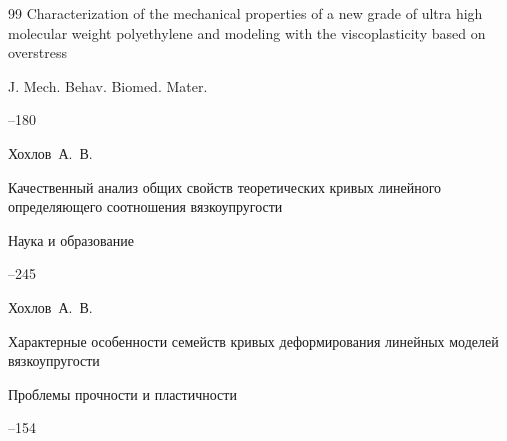 \begin{thebibliography}{99}
\paper Characterization of the mechanical properties of a new grade of ultra high molecular weight polyethylene and modeling with the viscoplasticity based on overstress

\jour J. Mech. Behav. Biomed. Mater.




--180







\by Хохлов~А.~В.

\paper Качественный анализ общих свойств теоретических кривых линейного определяющего соотношения вязкоупругости

\jour Наука и образование



--245
















\by Хохлов~А.~В.

\paper Характерные особенности семейств кривых деформирования линейных моделей вязкоупругости 

\jour Проблемы прочности и пластичности




--154






\end{thebibliography}




